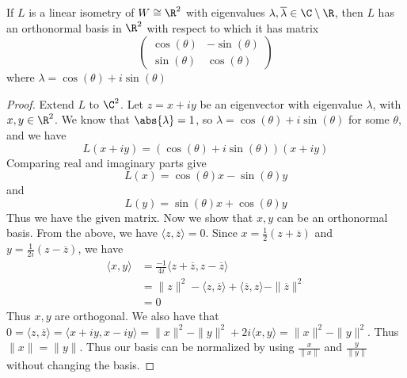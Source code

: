 \begin{lmm}{}{} If $L$ is a linear isometry of $W\cong\R^2$ with eigenvalues $\lambda,\overline{\lambda}\in\C\setminus\R$, then $L$ has an orthonormal basis in $\R^2$ with respect to which it has matrix $$\begin{pmatrix}\cos(\theta) & -\sin(\theta)\\ \sin(\theta) & \cos(\theta)\end{pmatrix}$$ where $\lambda=\cos(\theta)+i\sin(\theta)$\tcbline
\begin{proof} Extend $L$ to $\C^2$. Let $z=x+iy$ be an eigenvector with eigenvalue $\lambda$, with $x,y\in\R^2$. We know that $\abs{\lambda}=1$, so $\lambda=\cos(\theta)+i\sin(\theta)$ for some $\theta$, and we have $$L(x+iy)=(\cos(\theta)+i\sin(\theta))(x+iy)$$ Comparing real and imaginary parts give $$L(x)=\cos(\theta)x-\sin(\theta)y$$ and $$L(y)=\sin(\theta)x+\cos(\theta)y$$ Thus we have the given matrix. \linebreak\linebreak
Now we show that $x,y$ can be an orthonormal basis. From the above, we have $\langle z,\overline{z}\rangle=0$. Since $x=\frac{1}{2}(z+\overline{z})$ and $y=\frac{1}{2i}(z-\overline{z})$, we have
\begin{align*}
\langle x,y\rangle&=\frac{-1}{4i}\langle z+\overline{z},z-\overline{z}\rangle\\
&=\|z\|^2-\langle z,\overline{z}\rangle+\langle\overline{z},z\rangle-\|\overline{z}\|^2\\
&=0
\end{align*}
Thus $x,y$ are orthogonal. We also have that $0=\langle z,\overline{z}\rangle=\langle x+iy,x-iy\rangle=\|x\|^2-\|y\|^2+2i\langle x,y\rangle=\|x\|^2-\|y\|^2$. Thus $\|x\|=\|y\|$. Thus our basis can be normalized by using $\frac{x}{\|x\|}$ and $\frac{y}{\|y\|}$ without changing the basis. 
\end{proof}
\end{lmm}


